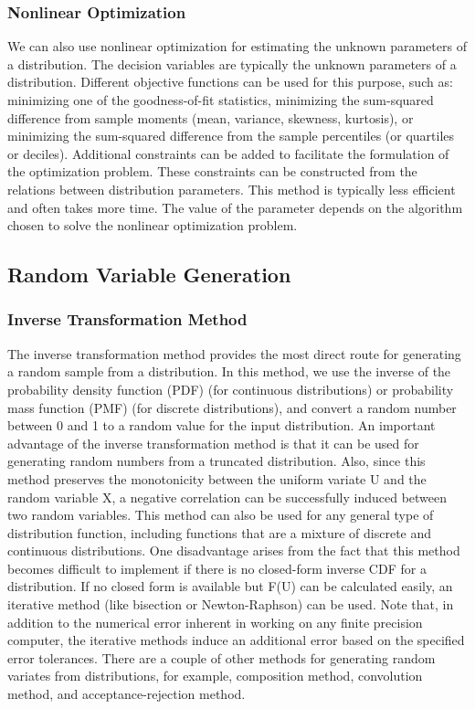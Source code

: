 \documentclass[12pt]{article}
\begin{document}
\subsubsection{ Nonlinear Optimization}
We can also use nonlinear optimization for estimating the
unknown parameters of a distribution. The decision variables are typically the unknown parameters of a distribution.
Different objective functions can be used for this purpose,
such as: minimizing one of the goodness-of-fit statistics,
minimizing the sum-squared difference from sample moments (mean, variance, skewness, kurtosis), or minimizing
the sum-squared difference from the sample percentiles (or
quartiles or deciles). Additional constraints can be added
to facilitate the formulation of the optimization problem.
These constraints can be constructed from the relations between distribution parameters. This method is typically
less efficient and often takes more time. The value of the
parameter depends on the algorithm chosen to solve the
nonlinear optimization problem.

    \subsection{Random Variable Generation}

    \subsubsection{ Inverse Transformation Method}
    The inverse transformation method provides the most direct
route for generating a random sample from a distribution.
In this method, we use the inverse of the probability density
function (PDF) (for continuous distributions) or probability
mass function (PMF) (for discrete distributions), and convert
a random number between 0 and 1 to a random value for
the input distribution.
An important advantage of the inverse transformation
method is that it can be used for generating random numbers
from a truncated distribution. Also, since this method
preserves the monotonicity between the uniform variate U
and the random variable X, a negative correlation can be
successfully induced between two random variables. This
method can also be used for any general type of distribution
function, including functions that are a mixture of discrete
and continuous distributions. One disadvantage arises from
the fact that this method becomes difficult to implement if
there is no closed-form inverse CDF for a distribution. If no
closed form is available but F(U) can be calculated easily, an
iterative method (like bisection or Newton-Raphson) can be
used. Note that, in addition to the numerical error inherent
in working on any finite precision computer, the iterative
methods induce an additional error based on the specified
error tolerances.
There are a couple of other methods for generating
random variates from distributions, for example, composition method, convolution method, and acceptance-rejection
method.
\end{document}
